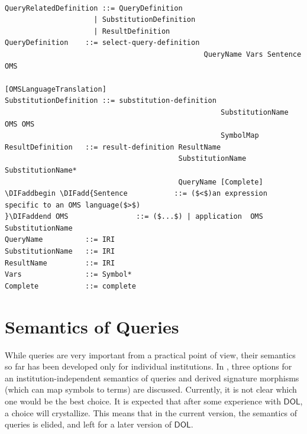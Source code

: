 \documentclass[10pt,fleqn,final]{scrreprt}
\newcommand*{\syntax}[1]{\texttt{#1}}
\newcommand{\semdom}[1]{
\begin{center}
\fbox{$#1$}
\end{center}
}
\newcommand*{\DOL}{\ensuremath{\mathsf{DOL}}\xspace}
\newcommand{\sclause}[1]{\section{#1}}
\providecommand{\DIFadd}[1]{{\protect\color{blue}\uwave{#1}}} %
\providecommand{\DIFaddbegin}{} %
\providecommand{\DIFaddend}{} %
\begin{document}
\begin{lstlisting}[language=ebnf,escapeinside={()},mathescape]  % abstract syntax

QueryRelatedDefinition ::= QueryDefinition
                     | SubstitutionDefinition
                     | ResultDefinition
QueryDefinition    ::= select-query-definition
                                               QueryName Vars Sentence OMS
                                               [OMSLanguageTranslation]
SubstitutionDefinition ::= substitution-definition
                                                   SubstitutionName OMS OMS
                                                   SymbolMap
ResultDefinition   ::= result-definition ResultName
                                         SubstitutionName SubstitutionName*
                                         QueryName [Complete]
\DIFaddbegin \DIFadd{Sentence           ::= ($<$)an expression specific to an OMS language($>$) 
}\DIFaddend OMS                ::= ($...$) | application  OMS  SubstitutionName 
QueryName          ::= IRI
SubstitutionName   ::= IRI
ResultName         ::= IRI
Vars               ::= Symbol*
Complete           ::= complete
\end{lstlisting}


\sclause{Semantics of Queries}\label{s:sem-queries}

While queries are very important from a practical point of view, their
semantics so far has been developed only for individual institutions.
In \cite{MossakowskiEtAl15a}, three options for an
institution-independent semantics of queries and derived signature
morphisms (which can map symbols to terms) are discussed. Currently,
it is not clear which one would be the best choice. It is expected
that after some experience with \DOL, a choice will crystallize. This
means that in the current version, the semantics of queries is
elided, and left for a later version of \DOL.

%
%
%
%

\end{document}
